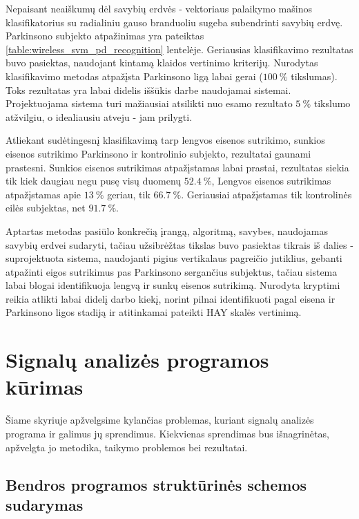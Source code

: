 \documentclass[]{vgtuef}
\begin{document}
Nepaisant neaiškumų dėl savybių erdvės - vektoriaus palaikymo mašinos klasifikatorius su radialiniu gauso branduoliu sugeba subendrinti savybių erdvę. Parkinsono subjekto atpažinimas yra pateiktas \ref{table:wireless_svm_pd_recognition} lentelėje. Geriausias klasifikavimo rezultatas buvo pasiektas, naudojant kintamą klaidos vertinimo kriterijų. Nurodytas klasifikavimo metodas atpažįsta Parkinsono ligą labai gerai ($100~\%$ tikslumas). Toks rezultatas yra labai didelis iššūkis darbe naudojamai sistemai. Projektuojama sistema turi mažiausiai atsilikti nuo esamo rezultato $5~\%$ tikslumo atžvilgiu, o idealiausiu atveju - jam prilygti. 

Atliekant sudėtingesnį klasifikavimą tarp lengvos eisenos sutrikimo, sunkios eisenos sutrikimo Parkinsono  ir kontrolinio subjekto, rezultatai gaunami prastesni. Sunkios eisenos sutrikimas atpažįstamas labai prastai, rezultatas siekia tik kiek daugiau negu pusę visų duomenų $52.4~\%$, Lengvos eisenos sutrikimas atpažįstamas apie $13~\%$ geriau, tik $66.7~\%$. Geriausiai atpažįstamas tik kontrolinės eilės subjektas, net $91.7~\%$.

Aptartas metodas pasiūlo konkrečią įrangą, algoritmą, savybes, naudojamas savybių erdvei sudaryti, tačiau užsibrėžtas tikslas buvo pasiektas tikrais iš dalies - suprojektuota sistema, naudojanti pigius vertikalaus pagreičio jutiklius, gebanti atpažinti eigos sutrikimus pas Parkinsono sergančius subjektus, tačiau sistema labai blogai identifikuoja lengvą ir sunkų eisenos sutrikimą. Nurodyta kryptimi reikia atlikti labai didelį darbo kiekį, norint pilnai identifikuoti pagal eisena ir Parkinsono ligos stadiją ir atitinkamai pateikti HAY skalės vertinimą.


\section{Signalų analizės programos kūrimas}

Šiame skyriuje apžvelgsime kylančias problemas, kuriant signalų
analizės programa ir galimus jų sprendimus. Kiekvienas sprendimas bus
išnagrinėtas, apžvelgta jo metodika, taikymo problemos bei rezultatai.

\subsection{Bendros programos struktūrinės schemos sudarymas}
\end{document}
